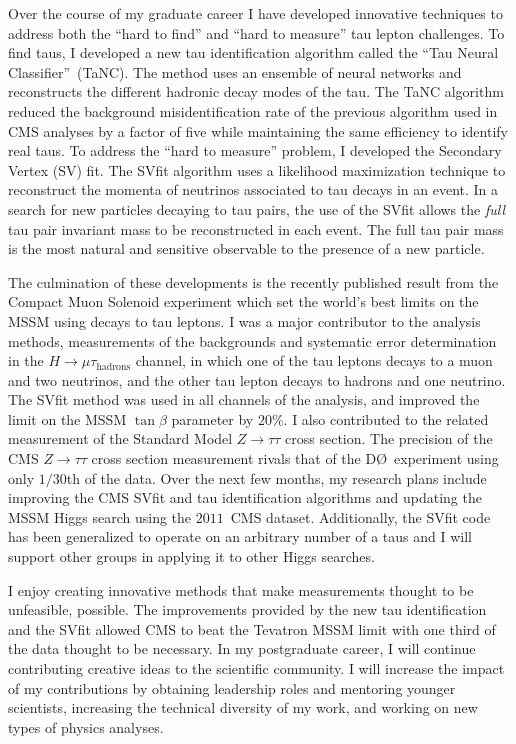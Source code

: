 \documentclass{scrartcl}        %
\begin{document}
\begin{cv}{}
Over the course of my graduate career I have developed innovative techniques to
address both the ``hard to find'' and ``hard to measure'' tau lepton
challenges.  To find taus, I developed a new tau identification
algorithm called the ``Tau Neural Classifier''~(TaNC).  The method uses an ensemble of
neural networks and reconstructs the different hadronic decay modes of the tau.
The TaNC algorithm reduced the background misidentification
rate of the previous algorithm used in CMS analyses by a factor of five while
maintaining the same efficiency to identify real taus.  To address the ``hard to
measure'' problem, I developed the Secondary Vertex (SV) fit.  The SVfit
algorithm uses a likelihood maximization technique to reconstruct the 
momenta of neutrinos associated to tau decays in an event.  In a search for
new particles decaying to tau pairs, the use of the SVfit allows the
\emph{full} tau pair invariant mass to be reconstructed in each event. The
full tau pair mass is the most natural and sensitive observable to the
presence of a new particle.

The culmination of these developments is the recently published result from the
Compact Muon Solenoid experiment which set the world's best limits on the MSSM
using decays to tau leptons.  I was a major contributor to the analysis methods,
measurements of the backgrounds and systematic error determination in the $H \to
\mu \tau_{\mathrm{hadrons}}$ channel, in which one of the tau leptons decays to
a muon and two neutrinos, and the other tau lepton decays to hadrons and one
neutrino.  The SVfit method was used in all channels of the analysis, and
improved the limit on the MSSM $\tan\beta$ parameter by $20\%$.  I also
contributed to the related measurement of the Standard Model $Z\to\tau\tau$
cross section. The precision of the CMS $Z\to\tau\tau$ cross section measurement
rivals that of the D\O~experiment using only $1/30$th of the data.  Over the
next few months, my research plans include improving the CMS SVfit and tau
identification algorithms and updating the MSSM Higgs search using the $2011$~CMS
dataset.  Additionally, the SVfit code has been generalized to operate on an
arbitrary number of a taus and I will support other groups in applying it to
other Higgs searches.  

I enjoy creating innovative methods that make measurements thought to be
unfeasible, possible.  The improvements provided by the new tau identification
and the SVfit allowed CMS to beat the Tevatron MSSM limit with one third of the
data thought to be necessary.   In my postgraduate career, I will continue
contributing creative ideas to the scientific community.  I will increase the
impact of my contributions by obtaining leadership roles and mentoring younger
scientists, increasing the technical diversity of my work, and working on new
types of physics analyses.


\end{cv}
\end{document}
